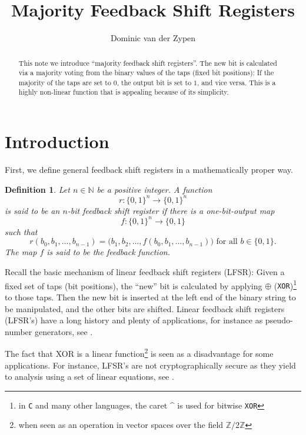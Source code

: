 \documentclass[12pt, a4paper]{amsart}
\newtheorem{definition}[lemma]{\bf Definition}
\begin{document}
\title{Majority Feedback Shift Registers}
\author{Dominic van der Zypen}
\begin{abstract}
This note we introduce ``majority feedback shift registers''. The
new bit is calculated via a majority voting from the binary values
	of the taps (fixed bit positions): If the majority of the 
	taps are set to $0$, the output bit is set to $1$, and vice
	versa. This is a highly non-linear function that is appealing
	because of its simplicity.
\end{abstract}
\maketitle
\section{Introduction}

First, we define general feedback shift registers
in a mathematically proper way.

\begin{definition}
\emph{
Let $n\in\mathbb{N}$ be a positive integer.
A function $$r:\{0,1\}^n \to \{0,1\}^n$$ is said to be
an {\em $n$-bit feedback shift register} 
if there is a one-bit-output map $$f : \{0,1\}^n \to \{0,1\}$$ such that 
$$r(b_0, b_1,\ldots, b_{n-1})
=  \big(b_1, b_2, \ldots, f(b_0, b_1,\ldots, b_{n-1})\big) \text{ for all } 
	b\in\{0,1\}.$$ 
The map $f$ is said to be the {\em feedback function}.
}
\end{definition}
Recall the basic mechanism of linear feedback shift registers (LFSR): 
Given a fixed set of taps (bit positions), the ``new'' bit is calculated 
by applying $\oplus$ ({\tt XOR})\footnote{in {\tt C} and many other 
languages, the caret {\string^} is used for bitwise {\tt XOR}}
to those taps. Then the new bit 
is inserted at the left end of the binary string to be manipulated,
and the other bits are shifted. 
Linear feedback shift registers (LFSR's) have a long history
and plenty of applications, for instance as pseudo-number generators,
see \cite{golo}.

The fact that XOR is a linear 
function\footnote{when seen as an operation in vector spaces over
the field $\mathbb{Z}/2\mathbb{Z}$} 
is seen as a disadvantage for some applications. For instance,
LFSR's are not cryptographically secure as they yield to
analysis using a set of linear equations, see \cite{mar}.
\end{document}
